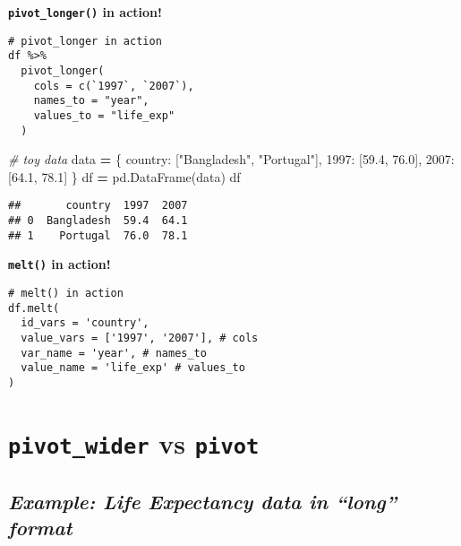 \documentclass[
]{book}
\newenvironment{Shaded}{\begin{snugshade}}{\end{snugshade}}
\newcommand{\CommentTok}[1]{\textcolor[rgb]{0.56,0.35,0.01}{\textit{#1}}}
\newcommand{\FloatTok}[1]{\textcolor[rgb]{0.00,0.00,0.81}{#1}}
\newcommand{\NormalTok}[1]{#1}
\newcommand{\OperatorTok}[1]{\textcolor[rgb]{0.81,0.36,0.00}{\textbf{#1}}}
\newcommand{\StringTok}[1]{\textcolor[rgb]{0.31,0.60,0.02}{#1}}
\begin{document}
{\textbf{\texttt{pivot\_longer()} in action!}}

\begin{verbatim}
# pivot_longer in action
df %>% 
  pivot_longer(
    cols = c(`1997`, `2007`),
    names_to = "year",
    values_to = "life_exp"
  )
\end{verbatim}

\begin{Shaded}
\begin{Highlighting}[]
\CommentTok{\# toy data}
\NormalTok{data }\OperatorTok{=}\NormalTok{ \{}
  \StringTok{\textquotesingle{}country\textquotesingle{}}\NormalTok{: [}\StringTok{"Bangladesh"}\NormalTok{, }\StringTok{"Portugal"}\NormalTok{],}
  \StringTok{\textquotesingle{}1997\textquotesingle{}}\NormalTok{: [}\FloatTok{59.4}\NormalTok{, }\FloatTok{76.0}\NormalTok{],}
  \StringTok{\textquotesingle{}2007\textquotesingle{}}\NormalTok{: [}\FloatTok{64.1}\NormalTok{, }\FloatTok{78.1}\NormalTok{]}
\NormalTok{\}}
\NormalTok{df }\OperatorTok{=}\NormalTok{ pd.DataFrame(data)}
\NormalTok{df}
\end{Highlighting}
\end{Shaded}

\begin{verbatim}
##       country  1997  2007
## 0  Bangladesh  59.4  64.1
## 1    Portugal  76.0  78.1
\end{verbatim}

{\textbf{\texttt{melt()} in action!}}

\begin{verbatim}
# melt() in action
df.melt(
  id_vars = 'country',
  value_vars = ['1997', '2007'], # cols
  var_name = 'year', # names_to
  value_name = 'life_exp' # values_to
)
\end{verbatim}

\hypertarget{pivot_wider-vs-pivot}{%
\section{\texorpdfstring{\texttt{pivot\_wider} vs \texttt{pivot}}{pivot\_wider vs pivot}}\label{pivot_wider-vs-pivot}}

\hypertarget{example-life-expectancy-data-in-long-format}{%
\subsection{\texorpdfstring{\emph{Example: Life Expectancy data in ``long'' format}}{Example: Life Expectancy data in ``long'' format}}\label{example-life-expectancy-data-in-long-format}}
\end{document}
